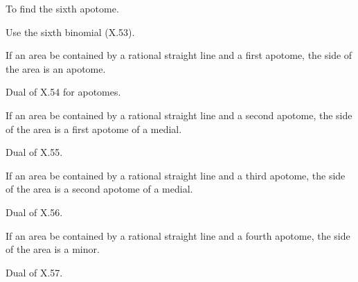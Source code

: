\begin{claim}
\label{prop:X.90}
To find the sixth apotome.
\end{claim}
\begin{evidence}[Proof of X.90]
\label{ev:X.90}
Use the sixth binomial (X.53).
\end{evidence}

\begin{claim}
\label{prop:X.91}
If an area be contained by a rational straight line and a first
apotome, the side of the area is an apotome.
\end{claim}
\begin{evidence}[Proof of X.91]
\label{ev:X.91}
Dual of X.54 for apotomes.
\end{evidence}

\begin{claim}
\label{prop:X.92}
If an area be contained by a rational straight line and a second
apotome, the side of the area is a first apotome of a medial.
\end{claim}
\begin{evidence}[Proof of X.92]
\label{ev:X.92}
Dual of X.55.
\end{evidence}

\begin{claim}
\label{prop:X.93}
If an area be contained by a rational straight line and a third
apotome, the side of the area is a second apotome of a medial.
\end{claim}
\begin{evidence}[Proof of X.93]
\label{ev:X.93}
Dual of X.56.
\end{evidence}

\begin{claim}
\label{prop:X.94}
If an area be contained by a rational straight line and a fourth
apotome, the side of the area is a minor.
\end{claim}
\begin{evidence}[Proof of X.94]
\label{ev:X.94}
Dual of X.57.
\end{evidence}

